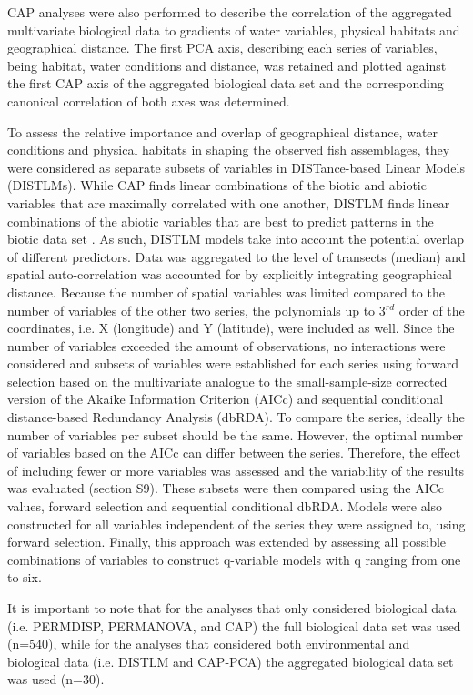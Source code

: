 CAP analyses were also performed to describe the correlation of the aggregated multivariate biological data to gradients of water variables, physical habitats and geographical distance. The first PCA axis, describing each series of variables, being habitat, water conditions and distance, was retained and plotted against the first CAP axis of the aggregated biological data set and the corresponding canonical correlation of both axes was determined.

To assess the relative importance and overlap of geographical distance, water conditions and physical habitats in shaping the observed fish assemblages, they were considered as separate subsets of variables in DISTance-based Linear Models (DISTLMs). While CAP finds linear combinations of the biotic and abiotic variables that are maximally correlated with one another, DISTLM finds linear combinations of the abiotic variables that are best to predict patterns in the biotic data set \citep{Anderson2008PERMANOVA+Methods}. As such, DISTLM models take into account the potential overlap of different predictors. Data was aggregated to the level of transects (median) and spatial auto-correlation was accounted for by explicitly integrating geographical distance. Because the number of spatial variables was limited compared to the number of variables of the other two series, the polynomials up to 3$^{rd}$ order of the coordinates, i.e. X (longitude) and Y (latitude), were included as well. Since the number of variables exceeded the amount of observations, no interactions were considered and subsets of variables were established for each series using forward selection based on the multivariate analogue to the small-sample-size corrected version of the Akaike Information Criterion (AICc) and sequential conditional distance-based Redundancy Analysis (dbRDA). To compare the series, ideally the number of variables per subset should be the same. However, the optimal number of variables based on the AICc can differ between the series. Therefore, the effect of including fewer or more variables was assessed and the variability of the results was evaluated (section S9). These subsets were then compared using the AICc values, forward selection and sequential conditional dbRDA. Models were also constructed for all variables independent of the series they were assigned to, using forward selection. Finally, this approach was extended by assessing all possible combinations of variables to construct q-variable models with q ranging from one to six.  

It is important to note that for the analyses that only considered biological data (i.e. PERMDISP, PERMANOVA, and CAP) the full biological data set was used (n=540), while for the analyses that considered both environmental and biological data (i.e. DISTLM and CAP-PCA) the aggregated biological data set was used (n=30).